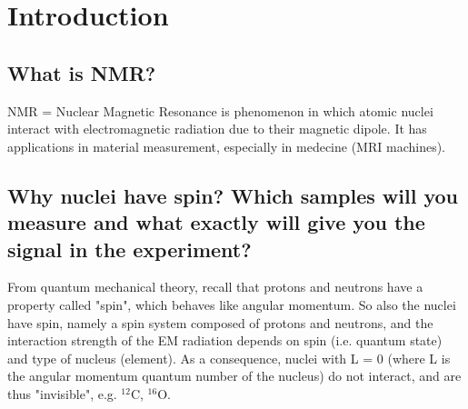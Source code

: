 \documentclass[12pt]{article}
\begin{document}
%
%
%
%
%
%
%
\section{Introduction}

\subsection{What is NMR?}

NMR = Nuclear Magnetic Resonance is phenomenon in which atomic nuclei interact with electromagnetic radiation due to their magnetic dipole. It has applications in material measurement, especially in medecine (MRI machines).


\subsection{Why nuclei have spin? Which samples will you measure and what exactly will give you the signal in the experiment?}

From quantum mechanical theory, recall that protons and neutrons have a property called "spin", which behaves like angular momentum. So also the nuclei have spin, namely a spin system composed of protons and neutrons, and the interaction strength of the EM radiation depends on spin (i.e. quantum state) and type of nucleus (element). As a consequence, nuclei with L = 0 (where L is the angular momentum quantum number of the nucleus) do not interact, and are thus "invisible", e.g. $^{12}\text{C}$, $^{16}\text{O}$. %
\end{document}
